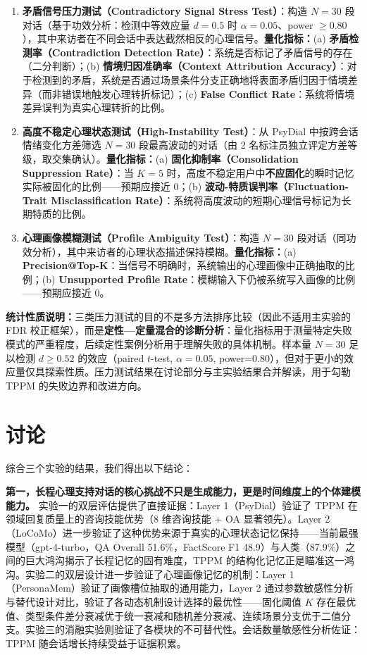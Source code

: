 \documentclass[12pt,a4paper]{article}
\begin{document}
\begin{enumerate}
  \item \textbf{矛盾信号压力测试（Contradictory Signal Stress Test）}：构造 $N=30$ 段对话（基于功效分析：检测中等效应量 $d=0.5$ 时 $\alpha=0.05$、power $\geq 0.80$），其中来访者在不同会话中表达截然相反的心理信号。\textbf{量化指标：}(a) \textbf{矛盾检测率（Contradiction Detection Rate）}：系统是否标记了矛盾信号的存在（二分判断）；(b) \textbf{情境归因准确率（Context Attribution Accuracy）}：对于检测到的矛盾，系统是否通过场景条件分支正确地将表面矛盾归因于情境差异（而非错误地触发心理转折标记）；(c) \textbf{False Conflict Rate}：系统将情境差异误判为真实心理转折的比例。
  \item \textbf{高度不稳定心理状态测试（High-Instability Test）}：从 PsyDial 中按跨会话情绪变化方差筛选 $N=30$ 段最高波动的对话（由 2 名标注员独立评定方差等级，取交集确认）。\textbf{量化指标：}(a) \textbf{固化抑制率（Consolidation Suppression Rate）}：当 $K=5$ 时，高度不稳定用户中\textbf{不应固化}的瞬时记忆实际被固化的比例——预期应接近 0；(b) \textbf{波动-特质误判率（Fluctuation-Trait Misclassification Rate）}：系统将高度波动的短期心理信号标记为长期特质的比例。
  \item \textbf{心理画像模糊测试（Profile Ambiguity Test）}：构造 $N=30$ 段对话（同功效分析），其中来访者的心理状态描述保持模糊。\textbf{量化指标：}(a) \textbf{Precision@Top-K}：当信号不明确时，系统输出的心理画像中正确抽取的比例；(b) \textbf{Unsupported Profile Rate}：模糊输入下仍被系统写入画像的比例——预期应接近 0。
\end{enumerate}

\textbf{统计性质说明：}三类压力测试的目的不是多方法排序比较（因此不适用主实验的 FDR 校正框架），而是\textbf{定性—定量混合的诊断分析}：量化指标用于测量特定失败模式的严重程度，后续定性案例分析用于理解失败的具体机制。样本量 $N=30$ 足以检测 $d \geq 0.52$ 的效应（paired $t$-test, $\alpha=0.05$, power=0.80），但对于更小的效应量仅具探索性质。压力测试结果在讨论部分与主实验结果合并解读，用于勾勒 TPPM 的失败边界和改进方向。

\section{讨论}
\label{sec:discussion}

综合三个实验的结果，我们得出以下结论：

\textbf{第一，长程心理支持对话的核心挑战不只是生成能力，更是时间维度上的个体建模能力。}
实验一的双层评估提供了直接证据：Layer 1（PsyDial）验证了 TPPM 在领域回复质量上的咨询技能优势（8 维咨询技能 + OA 显著领先）。Layer 2（LoCoMo）进一步验证了这种优势来源于真实的心理状态记忆保持——当前最强模型（gpt-4-turbo，QA Overall 51.6\%，FactScore F1 48.9）与人类（87.9\%）之间的巨大鸿沟揭示了长程记忆的固有难度，TPPM 的结构化记忆正是瞄准这一鸿沟。实验二的双层设计进一步验证了心理画像记忆的机制：Layer 1（PersonaMem）验证了画像槽位抽取的通用能力，Layer 2 通过参数敏感性分析与替代设计对比，验证了各动态机制设计选择的最优性——固化阈值 $K$ 存在最优值、类型条件差分衰减优于统一衰减和随机差分衰减、连续场景分支优于二值分支。实验三的消融实验则验证了各模块的不可替代性。会话数量敏感性分析佐证：TPPM 随会话增长持续受益于证据积累。
\end{document}
